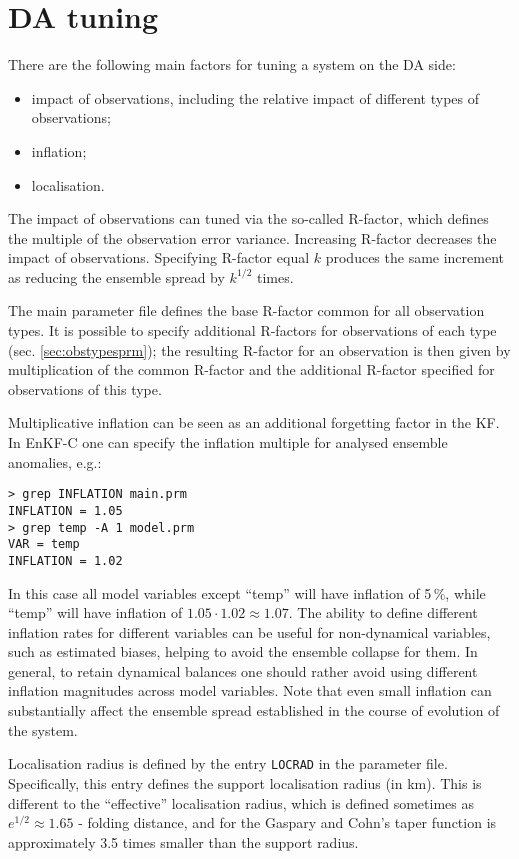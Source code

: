 \documentclass[11pt]{report}
\begin{document}
\section{DA tuning}
\label{sec:datuning}

There are the following main factors for tuning a system on the DA side:
\begin{itemize}
\item impact of observations, including the relative impact of different types of observations;
\item inflation;
\item localisation.
\end{itemize}

The impact of observations can tuned via the so-called R-factor, which defines the multiple of the observation error variance.
Increasing R-factor decreases the impact of observations.
Specifying R-factor equal $k$ produces the same increment as reducing the ensemble spread by $k^{1/2}$ times.

The main parameter file defines the base R-factor common for all observation types.
It is possible to specify additional R-factors for observations of each type (sec. \ref{sec:obstypesprm}); the resulting R-factor for an observation is then given by multiplication of the common R-factor and the additional R-factor specified for observations of this type.

Multiplicative inflation can be seen as an additional forgetting factor in the KF.
In EnKF-C one can specify the inflation multiple for analysed ensemble anomalies, e.g.:
\begin{Verbatim}[frame=single,fontsize=\footnotesize]
> grep INFLATION main.prm
INFLATION = 1.05
> grep temp -A 1 model.prm
VAR = temp
INFLATION = 1.02
\end{Verbatim}
In this case all model variables except ``temp'' will have inflation of 5\,\%, while ``temp'' will have inflation of $1.05 \cdot 1.02 \approx 1.07$.
The ability to define different inflation rates for different variables can be useful for non-dynamical variables, such as estimated biases, helping to avoid the ensemble collapse for them.
In general, to retain dynamical balances one should rather avoid using different inflation magnitudes across model variables.
Note that even small inflation can substantially affect the ensemble spread established in the course of evolution of the system.

Localisation radius is defined by the entry \verb|LOCRAD| in the parameter file.
Specifically, this entry defines the support localisation radius (in km).
This is different to the ``effective'' localisation radius, which is defined sometimes as $e^{1/2}\approx 1.65$ - folding distance, and for the Gaspary and Cohn's taper function is approximately 3.5 times smaller than the support radius.
\end{document}
